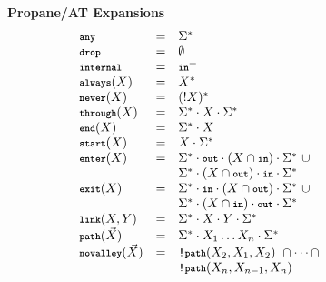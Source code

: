 \documentclass[twocolumn, openany]{sig-alternate-10pt}
\newcommand{\KW}[1]{\texttt{\small\bfseries{#1}}}
\newcommand{\Any}{\KW{any}}
\newcommand{\None}{\KW{drop}}
\newcommand{\In}{\KW{in}}
\newcommand{\Out}{\KW{out}}
\newcommand{\NOT}{\texttt{!}}
\newcommand{\Exit}{\KW{exit}}
\newcommand{\End}{\KW{end}}
\newcommand{\Start}{\KW{start}}
\newcommand{\Enter}{\KW{enter}}
\newcommand{\Internal}{\KW{internal}}
\newcommand{\Never}{\KW{never}}
\newcommand{\Always}{\KW{always}}
\newcommand{\Through}{\KW{through}}
\newcommand{\LinkKW}{\KW{link}}
\newcommand{\PathKW}{\KW{path}}
\newcommand{\Novalley}{\KW{novalley}}
\newcommand{\hdr}[2]{\flushleft \chdr{\hspace{5mm}#1}{#2}}
\newcommand{\chdr}[2]{\textbf{#1} {#2} \\ \centering}%
\begin{document}
\begin{figure*}[h!]
\begin{minipage}[t]{.45\linewidth}
  \end{minipage}
  \begin{minipage}[t]{.5\linewidth}\small
  \hdr{Propane/AT Expansions}{}
  \vspace*{-1\baselineskip}
  \[\begin{array}{lcl}
    \Any               & = & \Sigma^* \\
    \None              & = & \emptyset \\
    \Internal          & = & \In^+ \\
    \Always(X)         & = & X^* \\
    \Never(X)          & = & (!X)^* \\
    \Through(X)        & = & \Sigma^* \cdot X \cdot \Sigma^* \\
    \End(X)            & = & \Sigma^* \cdot X \\
    \Start(X)          & = & X \cdot \Sigma^* \\
    \Enter(X)          & = & \Sigma^* \cdot \Out \cdot (X \cap \In) \cdot \Sigma^* ~ \cup \\
                       &   & \Sigma^* \cdot (X \cap \Out) \cdot \In \cdot \Sigma^* \\
    \Exit(X)           & = & \Sigma^* \cdot \In \cdot (X \cap \Out) \cdot \Sigma^* ~ \cup \\
                       &   & \Sigma^* \cdot (X \cap \In) \cdot \Out \cdot \Sigma^* \\
    \LinkKW(X,Y)       & = & \Sigma^* \cdot X \cdot Y \cdot \Sigma^* \\
    \PathKW(\vec{X})   & = & \Sigma^* \cdot X_1 \dots X_n \cdot \Sigma^* \\
    \Novalley(\vec{X}) & = & \NOT\PathKW(X_2,X_1,X_2) ~ \cap \dots \cap \\
                       &   & \NOT\PathKW(X_n,X_{n-1},X_n) \\
  \end{array} \]%

  \end{minipage}%


\end{figure*}
\end{document}

